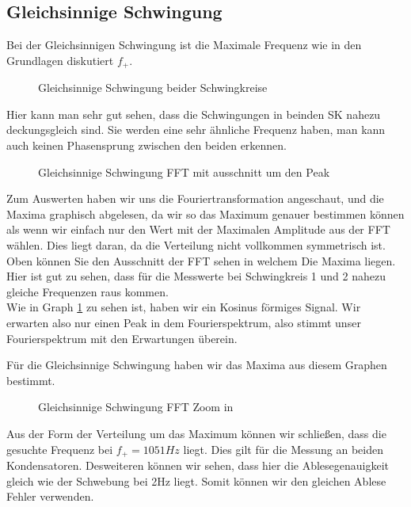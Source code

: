 \documentclass[twoside]{protokoll}
\begin{document}
\subsection{Gleichsinnige Schwingung}
Bei der Gleichsinnigen Schwingung ist die Maximale Frequenz wie in den Grundlagen diskutiert $f_+$.
\begin{figure}[H]
    \centering
    \caption{Gleichsinnige Schwingung beider Schwingkreise}
    \label{gleichsinnige Schwingung}
\end{figure}
Hier kann man sehr gut sehen, dass die Schwingungen in beinden SK nahezu deckungsgleich sind. Sie werden eine sehr ähnliche Frequenz haben, man kann auch keinen Phasensprung zwischen den beiden erkennen.
\begin{figure}[H]
    \centering
    \caption{Gleichsinnige Schwingung FFT mit ausschnitt um den Peak}
\end{figure}
Zum Auswerten haben wir uns die Fouriertransformation angeschaut, und die Maxima graphisch abgelesen, da wir so das Maximum genauer bestimmen können als wenn wir einfach nur den Wert mit der Maximalen Amplitude aus der FFT wählen.
Dies liegt daran, da die Verteilung nicht vollkommen symmetrisch ist.
Oben können Sie den Ausschnitt der FFT sehen in welchem Die Maxima liegen. 
Hier ist gut zu sehen, dass für die Messwerte bei Schwingkreis 1 und 2 nahezu gleiche Frequenzen raus kommen.\\
Wie in Graph \ref{gleichsinnige Schwingung} zu sehen ist, haben wir ein Kosinus förmiges Signal. Wir erwarten also nur einen Peak in dem Fourierspektrum, also stimmt unser Fourierspektrum mit den Erwartungen überein. 


Für die Gleichsinnige Schwingung haben wir das Maxima aus diesem Graphen bestimmt. 
\begin{figure}[H]
    \centering
    \caption{Gleichsinnige Schwingung FFT Zoom in}
\end{figure}
Aus der Form der Verteilung um das Maximum können wir schließen, dass die gesuchte Frequenz bei $f_+=1051Hz$ liegt. Dies gilt für die Messung an beiden Kondensatoren.
Desweiteren können wir sehen, dass hier die Ablesegenauigkeit gleich wie der Schwebung bei 2Hz liegt. Somit können wir den gleichen Ablese Fehler verwenden.

 
\end{document}
